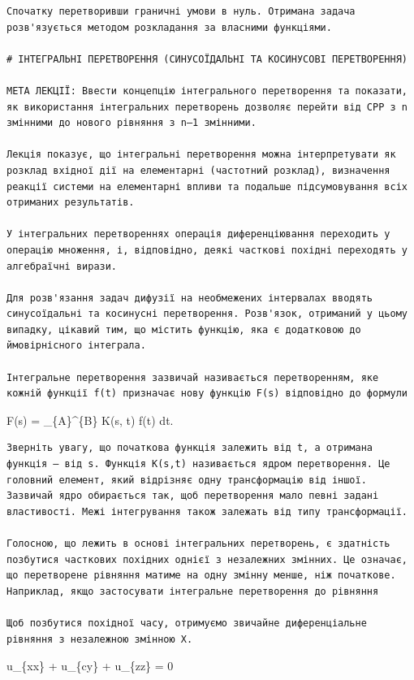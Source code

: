 \documentclass[
  ukrainian,
]{article}
\begin{document}
\begin{verbatim}
Спочатку перетворивши граничні умови в нуль. Отримана задача розв'язується методом розкладання за власними функціями.

# ІНТЕГРАЛЬНІ ПЕРЕТВОРЕННЯ (СИНУСОЇДАЛЬНІ ТА КОСИНУСОВІ ПЕРЕТВОРЕННЯ)

МЕТА ЛЕКЦІЇ: Ввести концепцію інтегрального перетворення та показати, як використання інтегральних перетворень дозволяє перейти від CPP з n змінними до нового рівняння з n—1 змінними.

Лекція показує, що інтегральні перетворення можна інтерпретувати як розклад вхідної дії на елементарні (частотний розклад), визначення реакції системи на елементарні впливи та подальше підсумовування всіх отриманих результатів.

У інтегральних перетвореннях операція диференціювання переходить у операцію множення, і, відповідно, деякі часткові похідні переходять у алгебраїчні вирази.

Для розв'язання задач дифузії на необмежених інтервалах вводять синусоїдальні та косинусні перетворення. Розв'язок, отриманий у цьому випадку, цікавий тим, що містить функцію, яка є додатковою до ймовірнісного інтеграла.

Інтегральне перетворення зазвичай називається перетворенням, яке кожній функції f(t) призначає нову функцію F(s) відповідно до формули
\end{verbatim}

F(s) = \int\_\{A\}\^{}\{B\} K(s, t) f(t) dt.

\begin{verbatim}
Зверніть увагу, що початкова функція залежить від t, а отримана функція — від s. Функція K(s,t) називається ядром перетворення. Це головний елемент, який відрізняє одну трансформацію від іншої. Зазвичай ядро обирається так, щоб перетворення мало певні задані властивості. Межі інтегрування також залежать від типу трансформації.

Голосною, що лежить в основі інтегральних перетворень, є здатність позбутися часткових похідних однієї з незалежних змінних. Це означає, що перетворене рівняння матиме на одну змінну менше, ніж початкове. Наприклад, якщо застосувати інтегральне перетворення до рівняння

Щоб позбутися похідної часу, отримуємо звичайне диференціальне рівняння з незалежною змінною X.
\end{verbatim}

u\_\{xx\} + u\_\{cy\} + u\_\{zz\} = 0
\end{document}
